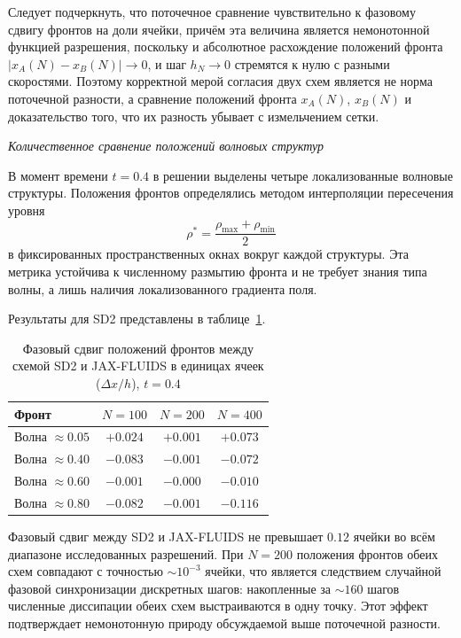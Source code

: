\documentclass[a4paper,14pt]{extarticle}
\theoremstyle{theorem}
\theoremstyle{lemma}
\begin{document}
Следует подчеркнуть, что поточечное сравнение чувствительно к фазовому сдвигу фронтов на доли ячейки, причём эта величина является немонотонной функцией разрешения, поскольку и абсолютное расхождение положений фронта $|x_A(N) - x_B(N)| \to 0$, и шаг $h_N \to 0$ стремятся к нулю с разными скоростями. Поэтому корректной мерой согласия двух схем является не норма поточечной разности, а сравнение положений фронта $x_A(N)$, $x_B(N)$ и доказательство того, что их разность убывает с измельчением сетки.

\textit{Количественное сравнение положений волновых структур}

В момент времени $t = 0.4$ в решении выделены четыре локализованные волновые структуры. Положения фронтов определялись методом интерполяции пересечения уровня
\begin{equation}
\rho^* = \frac{\rho_{\max} + \rho_{\min}}{2}
\end{equation}
в фиксированных пространственных окнах вокруг каждой структуры. Эта метрика устойчива к численному размытию фронта и не требует знания типа волны, а лишь наличия локализованного градиента поля.

Результаты для SD2 представлены в таблице~\ref{tab:front_shift_sd2}.

\begin{table}[!htbp]
    \centering
    \caption{Фазовый сдвиг положений фронтов между схемой SD2 и JAX-FLUIDS в единицах ячеек ($\Delta x / h$), $t = 0.4$}
    \vspace{0.1cm}
    \label{tab:front_shift_sd2}
    \begin{tabular}{lccc}
        \toprule
        Фронт & $N=100$ & $N=200$ & $N=400$ \\
        \midrule
        Волна $\approx 0.05$  & $+0.024$ & $+0.001$ & $+0.073$ \\
        Волна $\approx 0.40$  & $-0.083$ & $-0.001$ & $-0.072$ \\
        Волна $\approx 0.60$  & $-0.001$ & $-0.000$ & $-0.010$ \\
        Волна $\approx 0.80$  & $-0.082$ & $-0.001$ & $-0.116$ \\
        \bottomrule
    \end{tabular}
\end{table}

Фазовый сдвиг между SD2 и JAX-FLUIDS не превышает $0.12$ ячейки во всём диапазоне исследованных разрешений. При $N=200$ положения фронтов обеих схем совпадают с точностью $\sim 10^{-3}$ ячейки, что является следствием случайной фазовой синхронизации дискретных шагов: накопленные за $\sim 160$ шагов численные диссипации обеих схем выстраиваются в одну точку. Этот эффект подтверждает немонотонную природу обсуждаемой выше поточечной разности.
\end{document}
